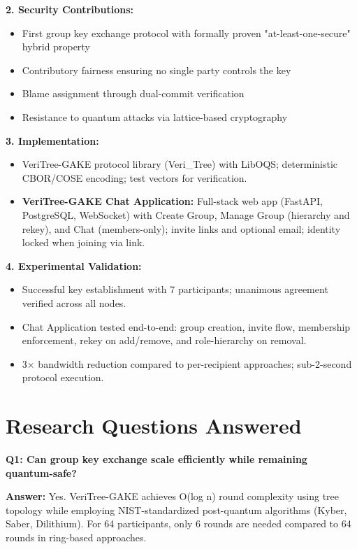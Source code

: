 \documentclass[12pt,a4paper]{report}
\begin{document}
\textbf{2. Security Contributions:}
\begin{itemize}
\item First group key exchange protocol with formally proven "at-least-one-secure" hybrid property
\item Contributory fairness ensuring no single party controls the key
\item Blame assignment through dual-commit verification
\item Resistance to quantum attacks via lattice-based cryptography
\end{itemize}

\textbf{3. Implementation:}
\begin{itemize}
\item VeriTree-GAKE protocol library (Veri\_Tree) with LibOQS; deterministic CBOR/COSE encoding; test vectors for verification.
\item \textbf{VeriTree-GAKE Chat Application:} Full-stack web app (FastAPI, PostgreSQL, WebSocket) with Create Group, Manage Group (hierarchy and rekey), and Chat (members-only); invite links and optional email; identity locked when joining via link.
\end{itemize}

\textbf{4. Experimental Validation:}
\begin{itemize}
\item Successful key establishment with 7 participants; unanimous agreement verified across all nodes.
\item Chat Application tested end-to-end: group creation, invite flow, membership enforcement, rekey on add/remove, and role-hierarchy on removal.
\item 3× bandwidth reduction compared to per-recipient approaches; sub-2-second protocol execution.
\end{itemize}

\section{Research Questions Answered}

\textbf{Q1: Can group key exchange scale efficiently while remaining quantum-safe?}

\textbf{Answer:} Yes. VeriTree-GAKE achieves O(log n) round complexity using tree topology while employing NIST-standardized post-quantum algorithms (Kyber, Saber, Dilithium). For 64 participants, only 6 rounds are needed compared to 64 rounds in ring-based approaches.
\end{document}
